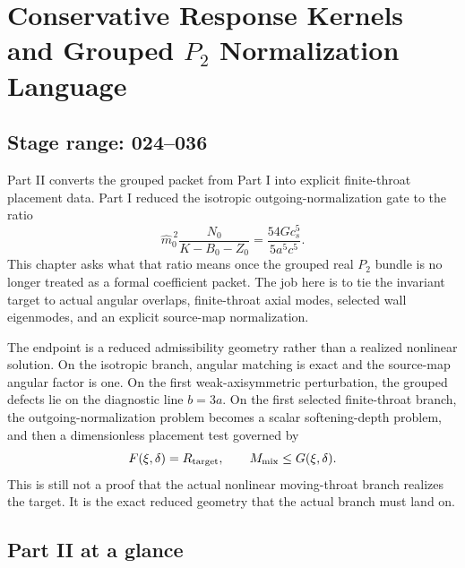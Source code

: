 \chapter{Conservative Response Kernels and Grouped \texorpdfstring{$P_2$}{P2} Normalization Language}
\label{chap:part02_conservative_response}
\section*{Stage range: 024--036}

Part II converts the grouped packet from Part I into explicit finite-throat placement data.  Part I reduced the isotropic outgoing-normalization gate to the ratio
\begin{equation}
\label{eq:part02-entry-normalization-ratio}
\widehat m_0^{\,2}\frac{N_0}{K-B_0-Z_0}
=
\frac{54G c_s^5}{5a^5c^5}.
\end{equation}
This chapter asks what that ratio means once the grouped real \(P_2\) bundle is no longer treated as a formal coefficient packet.  The job here is to tie the invariant target to actual angular overlaps, finite-throat axial modes, selected wall eigenmodes, and an explicit source-map normalization.

The endpoint is a reduced admissibility geometry rather than a realized nonlinear solution.  On the isotropic branch, angular matching is exact and the source-map angular factor is one.  On the first weak-axisymmetric perturbation, the grouped defects lie on the diagnostic line \(b=3a\).  On the first selected finite-throat branch, the outgoing-normalization problem becomes a scalar softening-depth problem, and then a dimensionless placement test governed by
\begin{equation}
\label{eq:part02-intro-FG}
F(\xi,\delta)=R_{\rm target},
\qquad
M_{\rm mix}\leq G(\xi,\delta).
\end{equation}
This is still not a proof that the actual nonlinear moving-throat branch realizes the target.  It is the exact reduced geometry that the actual branch must land on.

\section*{Part II at a glance}

